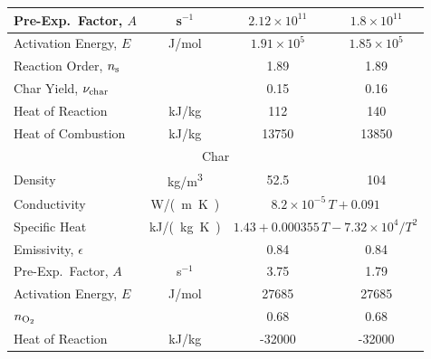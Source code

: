 \begin{table}[h!]
\begin{center}
\begin{tabular}{|l|c|c|c|}
Pre-Exp.~Factor, $A$         & s$^{-1}$      & $2.12 \times 10^{11}$           & $1.8 \times 10^{11}$              \\ \hline
Activation Energy, $E$       & J/mol         & $1.91 \times 10^{5}$            & $1.85 \times 10^{5}$              \\ \hline
Reaction Order, $n_{\rm s}$  &               & 1.89                            & 1.89                              \\ \hline
Char Yield, $\nu_{\rm char}$ &               & 0.15                            & 0.16                              \\ \hline
Heat of Reaction             & kJ/kg         & 112                             & 140                               \\ \hline
Heat of Combustion           & kJ/kg         & 13750                           & 13850                             \\ \hline
\multicolumn{4}{|c|}{Char}                                                                                         \\ \hline
Density                      & \unit{kg/m^3}      & 52.5                            & 104                               \\ \hline
Conductivity                 & \unit{W/(m.K)}& \multicolumn{2}{|c|}{$8.2\times 10^{-5}\, T+0.091$}                 \\ \hline
Specific Heat                & \unit{kJ/(kg.K)}       & \multicolumn{2}{|c|}{$1.43+0.000355\,T-7.32\times 10^4/T^2$}        \\ \hline
Emissivity, $\epsilon$       &               & 0.84                            & 0.84                              \\ \hline
Pre-Exp.~Factor, $A$         & s$^{-1}$      & 3.75                            & 1.79                              \\ \hline
Activation Energy, $E$       & J/mol         & 27685                           & 27685                             \\ \hline
$n_{\rm O_2}$                &               & 0.68                            & 0.68                              \\ \hline
Heat of Reaction             & kJ/kg         & -32000                          & -32000                            \\ \hline
\end{tabular}
\end{center}
\label{Aalto_Woods_Properties}
\end{table}


